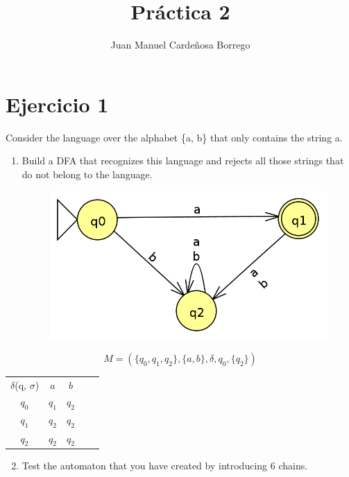 \documentclass[11pt]{article}
\title{\textbf{Práctica 2}}
\author{Juan Manuel Cardeñosa Borrego}
\date{}
\begin{document}
\maketitle
\thispagestyle{empty}

\section*{Ejercicio 1}
Consider the language over the alphabet \{a, b\} that only contains the string a.
\begin{enumerate}
\item Build a DFA that recognizes this language and rejects all those strings that
do not belong to the language.
\begin{figure}[htp]
\centering
\includegraphics[scale=0.30]{images/automata.png}
\label{}
\end{figure}
\end{enumerate}

\begin{equation}
	M = (\{q_0, q_1, q_2\}, \{a, b\}, \delta, q_0, \{q_2\})
\end{equation}

\begin{table}[]
\centering
\begin{tabular}{c|c|ccc}
$\delta$(q, $\sigma$) & $a$    & $b$    &  &  \\ \cline{1-3}
$q_0$   & $q_1$ & $q_2$&  &  \\ \cline{1-3}
$q_1$   & $q_2$ & $q_2$ &  &  \\ \cline{1-3}
$q_2$    & $q_2$ & $q_2$ &  & 
\end{tabular}
\end{table}

\begin{enumerate}
\setcounter{enumi}{1}
\item Test the automaton that you have created by introducing 6 chains.
\end{enumerate}
\end{document}

